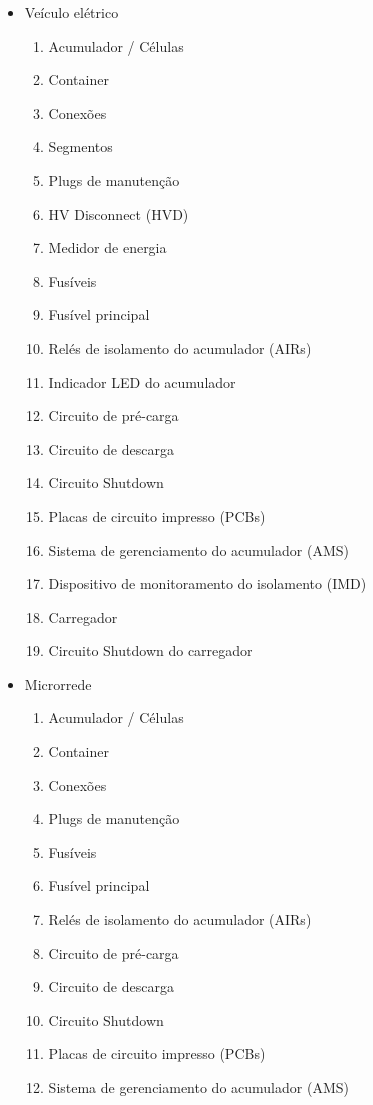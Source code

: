 \begin{itemize}

    \item Veículo elétrico
    
    \begin{enumerate}
        \item Acumulador / Células
        \item Container
        \item Conexões
        \item Segmentos
        \item Plugs de manutenção
        \item HV Disconnect (HVD)
        \item Medidor de energia
        \item Fusíveis
        \item Fusível principal
        \item Relés de isolamento do acumulador (AIRs)
        \item Indicador LED do acumulador
        \item Circuito de pré-carga
        \item Circuito de descarga
        \item Circuito Shutdown
        \item Placas de circuito impresso (PCBs)
        \item Sistema de gerenciamento do acumulador (AMS)
        \item Dispositivo de monitoramento do isolamento (IMD)
        \item Carregador
        \item Circuito Shutdown do carregador
    \end{enumerate}

    \item Microrrede
    
    \begin{enumerate}
        \item Acumulador / Células
        \item Container
        \item Conexões
        \item Plugs de manutenção
        \item Fusíveis
        \item Fusível principal
        \item Relés de isolamento do acumulador (AIRs)
        \item Circuito de pré-carga
        \item Circuito de descarga
        \item Circuito Shutdown
        \item Placas de circuito impresso (PCBs)
        \item Sistema de gerenciamento do acumulador (AMS)
    \end{enumerate}
    
\end{itemize}





